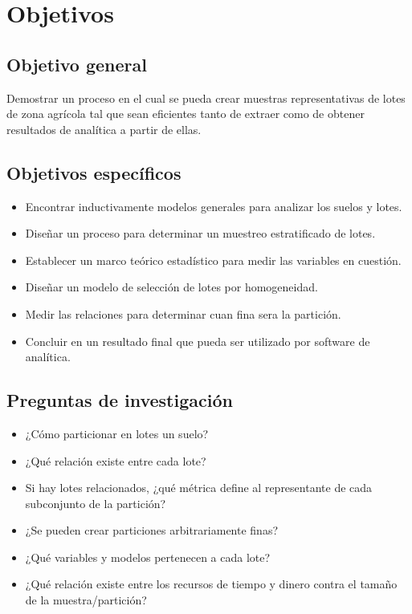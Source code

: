 \documentclass{report}
\begin{document}
\section{Objetivos}


\subsection{Objetivo general}

Demostrar un proceso en el cual se pueda crear muestras representativas de lotes de zona agrícola tal que sean eficientes tanto de extraer como de obtener resultados de analítica a partir de ellas.

\subsection{Objetivos específicos}

\begin{itemize}
    \item Encontrar inductivamente modelos generales para analizar los suelos y lotes. 
    \item Diseñar un proceso para determinar un muestreo estratificado de lotes.
    \item Establecer un marco teórico estadístico para medir las variables en cuestión.
    \item Diseñar un modelo de selección de lotes por homogeneidad.
    \item Medir las relaciones para determinar cuan fina sera la partición.
    \item Concluir en un resultado final que pueda ser utilizado por software de analítica.
\end{itemize}


\subsection{Preguntas de investigación}

\begin{itemize}
    \item ¿Cómo particionar en lotes un suelo?
    \item ¿Qué relación existe entre cada lote?
    \item Si hay lotes relacionados, ¿qué métrica define al representante de cada subconjunto de la partición?
    \item ¿Se pueden crear particiones arbitrariamente finas?
    
    \item ¿Qué variables y modelos pertenecen a cada lote?
    \item ¿Qué relación existe entre los recursos de tiempo y dinero contra el tamaño de la muestra/partición?
\end{itemize}
\end{document}
